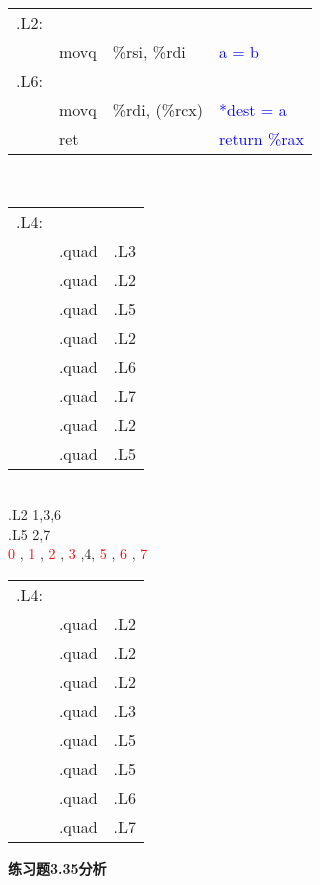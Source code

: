 \documentclass{article}
\newcommand{\blue}[1]{\textcolor{blue}{#1}}
\newcommand{\red}[1]{\textcolor{red}{#1}}
\begin{document}
\begin{CJK}{UTF8}{gbsn}
\begin{table}[ht]
\begin{tabular}{m{2em}m{3em}m{8em}l}
.L2:	&			&			&	\blue{}	\\
	&	movq		&	\%rsi, \%rdi	&	\blue{a = b}	\\
.L6:	&			&			&	\blue{}	\\
	&	movq		&	\%rdi, (\%rcx)	&	\blue{*dest = a}	\\
	&	ret		&			&	\blue{return \%rax}	\\
\end{tabular}
\end{table}	\\[-2ex]
\begin{table}[ht]
\begin{tabular}{m{2em}m{3em}m{8em}l}
.L4:	\\
	&	\multicolumn{2}{l}{.quad}	&	.L3	\\
	&	\multicolumn{2}{l}{.quad}	&	.L2	\\
	&	\multicolumn{2}{l}{.quad}	&	.L5	\\
	&	\multicolumn{2}{l}{.quad}	&	.L2	\\
	&	\multicolumn{2}{l}{.quad}	&	.L6	\\
	&	\multicolumn{2}{l}{.quad}	&	.L7	\\
	&	\multicolumn{2}{l}{.quad}	&	.L2	\\
	&	\multicolumn{2}{l}{.quad}	&	.L5	\\
\end{tabular}
\end{table}	\\[-2ex]
.L2 1,3,6	\\
.L5 2,7		\\
\red{ 0 },\red{ 1 },\red{ 2 },\red{ 3 },4,\red{ 5 },\red{ 6 },\red{ 7 }
\newpage
\begin{table}[ht]
\begin{tabular}{m{2em}m{3em}m{8em}l}
.L4:	\\
	&	\multicolumn{2}{l}{.quad}	&	.L2	\\
	&	\multicolumn{2}{l}{.quad}	&	.L2	\\
	&	\multicolumn{2}{l}{.quad}	&	.L2	\\
	&	\multicolumn{2}{l}{.quad}	&	.L3	\\
	&	\multicolumn{2}{l}{.quad}	&	.L5	\\
	&	\multicolumn{2}{l}{.quad}	&	.L5	\\
	&	\multicolumn{2}{l}{.quad}	&	.L6	\\
	&	\multicolumn{2}{l}{.quad}	&	.L7	\\
\end{tabular}
\end{table}	
\textbf{练习题3.35分析}	\\

\end{CJK}
\end{document}
